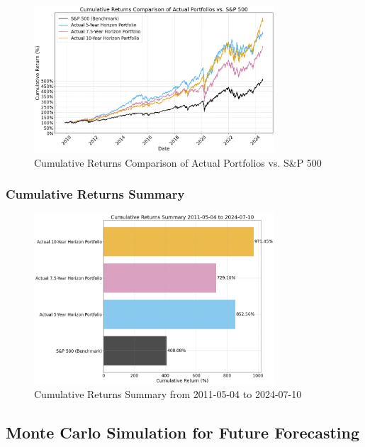 \begin{figure}[!htbp]
    \centering
    \includegraphics[width=0.8\textwidth]{../Figures/cumulative_returns_comparison.png}
    \caption{Cumulative Returns Comparison of Actual Portfolios vs. S\&P 500}
    \label{fig:cumulative_returns_comparison}
\end{figure}

\subsubsection{Cumulative Returns Summary}

\begin{figure}[!htbp]
    \centering
    \includegraphics[width=0.8\textwidth]{../Figures/cumulative_returns_summary.png}
    \caption{Cumulative Returns Summary from 2011-05-04 to 2024-07-10}
    \label{fig:cumulative_returns_summary}
\end{figure}




\newpage


\subsection{Monte Carlo Simulation for Future Forecasting}


